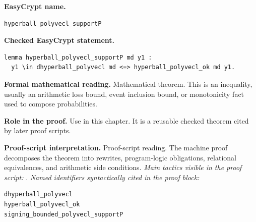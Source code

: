 \begin{formaltheorem}
\noindent\textbf{EasyCrypt name.}
\begin{lstlisting}[language=EasyCrypt,basicstyle=\ttfamily\scriptsize]
hyperball_polyvecl_supportP
\end{lstlisting}
\noindent\textbf{Checked EasyCrypt statement.}
\begin{lstlisting}[language=EasyCrypt,basicstyle=\ttfamily\scriptsize]
lemma hyperball_polyvecl_supportP md y1 :
  y1 \in dhyperball_polyvecl md <=> hyperball_polyvecl_ok md y1.
\end{lstlisting}
\noindent\textbf{Formal mathematical reading.}
Mathematical theorem. This is an inequality, usually an arithmetic loss bound, event inclusion bound, or monotonicity fact used to compose probabilities.

\noindent\textbf{Role in the proof.}
Use in this chapter. It is a reusable checked theorem cited by later proof scripts.

\noindent\textbf{Proof-script interpretation.}
Proof-script reading. The machine proof decomposes the theorem into rewrites, program-logic obligations, relational equivalences, and arithmetic side conditions.
\emph{Main tactics visible in the proof script:} .
\emph{Named identifiers syntactically cited in the proof block:}
\begin{lstlisting}[language=EasyCrypt,basicstyle=\ttfamily\scriptsize]
dhyperball_polyvecl
hyperball_polyvecl_ok
signing_bounded_polyvecl_supportP
\end{lstlisting}

\end{formaltheorem}

